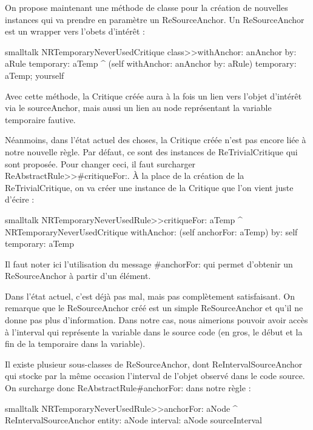 \documentclass[10pt,twoside,english]{_support/latex/sbabook/sbabook}
\begin{document}
On propose maintenant une m\'{e}thode de classe pour la cr\'{e}ation de nouvelles
instances qui va prendre en param\`{e}tre un ReSourceAnchor. Un ReSourceAnchor
est un wrapper vers l'obets d'int\'{e}r\^{e}t :
\begin{displaycode}{smalltalk}
NRTemporaryNeverUsedCritique class>>withAnchor: anAnchor by: aRule temporary: aTemp
	^ (self withAnchor: anAnchor by: aRule)
		temporary: aTemp;
		yourself
\end{displaycode}

Avec cette m\'{e}thode, la Critique cr\'{e}\'{e}e aura \`{a} la fois un lien vers l'objet
d'int\'{e}r\^{e}t via le sourceAnchor, mais aussi un lien au node repr\'{e}sentant la
variable temporaire fautive.

N\'{e}anmoins, dans l'\'{e}tat actuel des choses, la Critique cr\'{e}\'{e}e n'est pas encore
li\'{e}e \`{a} notre nouvelle r\`{e}gle. Par d\'{e}faut, ce sont des instances de
ReTrivialCritique qui sont propos\'{e}e. Pour changer ceci, il faut surcharger
ReAbstractRule\textgreater{}\textgreater{}\#critiqueFor:. \`{A} la place de la cr\'{e}ation de la
ReTrivialCritique, on va cr\'{e}er une instance de la Critique que l'on vient
juste d'\'{e}cire :
\begin{displaycode}{smalltalk}
NRTemporaryNeverUsedRule>>critiqueFor: aTemp
	^ NRTemporaryNeverUsedCritique
		withAnchor: (self anchorFor: aTemp)
		by: self
		temporary: aTemp
\end{displaycode}

Il faut noter ici l'utilisation du message \#anchorFor: qui permet d'obtenir un
ReSourceAnchor \`{a} partir d'un \'{e}l\'{e}ment.

Dans l'\'{e}tat actuel, c'est d\'{e}j\`{a} pas mal, mais pas compl\`{e}tement satisfaisant. On
remarque que le ReSourceAnchor cr\'{e}\'{e} est un simple ReSourceAnchor et qu'il ne
donne pas plus d'information. Dans notre cas, nous aimerions pouvoir avoir acc\`{e}s \`{a}
l'interval qui repr\'{e}sente la variable dans le source code (en gros, le d\'{e}but et
la fin de la temporaire dans la variable).

Il existe plusieur sous-classes de ReSourceAnchor, dont
ReIntervalSourceAnchor qui stocke par la m\^{e}me occasion l'interval de l'objet
observ\'{e} dans le code source. On surcharge donc ReAbstractRule\#anchorFor: dans notre r\`{e}gle :
\begin{displaycode}{smalltalk}
NRTemporaryNeverUsedRule>>anchorFor: aNode
	^ ReIntervalSourceAnchor entity: aNode interval: aNode sourceInterval
\end{displaycode}
\end{document}
